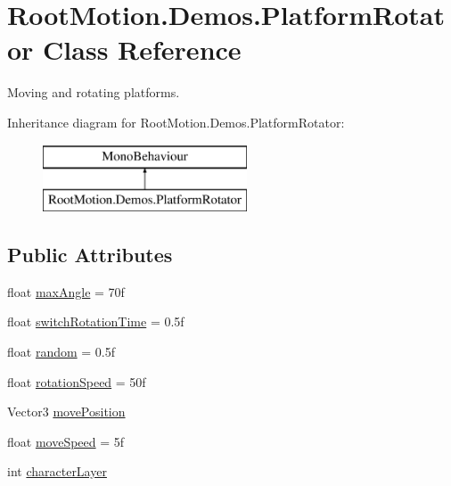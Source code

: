 \hypertarget{class_root_motion_1_1_demos_1_1_platform_rotator}{}\section{Root\+Motion.\+Demos.\+Platform\+Rotator Class Reference}
\label{class_root_motion_1_1_demos_1_1_platform_rotator}


Moving and rotating platforms.  


Inheritance diagram for Root\+Motion.\+Demos.\+Platform\+Rotator\+:\begin{figure}[H]
\begin{center}
\leavevmode
\includegraphics[height=2.000000cm]{class_root_motion_1_1_demos_1_1_platform_rotator}
\end{center}
\end{figure}
\subsection*{Public Attributes}
\begin{DoxyCompactItemize}
\item 
float \mbox{\hyperlink{class_root_motion_1_1_demos_1_1_platform_rotator_a55083563655029e1c5a25f69314bf52d}{max\+Angle}} = 70f
\item 
float \mbox{\hyperlink{class_root_motion_1_1_demos_1_1_platform_rotator_af5bf588dcf51d5f4e50c8de1c341e165}{switch\+Rotation\+Time}} = 0.\+5f
\item 
float \mbox{\hyperlink{class_root_motion_1_1_demos_1_1_platform_rotator_abdd710ab08e292a50a1475d6d80d6ee9}{random}} = 0.\+5f
\item 
float \mbox{\hyperlink{class_root_motion_1_1_demos_1_1_platform_rotator_a4cf89b575d84c04e0787e27630c94b32}{rotation\+Speed}} = 50f
\item 
Vector3 \mbox{\hyperlink{class_root_motion_1_1_demos_1_1_platform_rotator_aacbb5a4517343047cfed21d0f3b6dc48}{move\+Position}}
\item 
float \mbox{\hyperlink{class_root_motion_1_1_demos_1_1_platform_rotator_a88261712dff702e3e54664785678b5a1}{move\+Speed}} = 5f
\item 
int \mbox{\hyperlink{class_root_motion_1_1_demos_1_1_platform_rotator_a98c4268ffb425b41c086e21bec924683}{character\+Layer}}
\end{DoxyCompactItemize}


